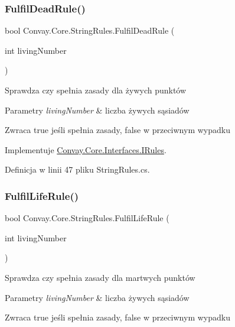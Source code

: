 \subsubsection{\texorpdfstring{Fulfil\+Dead\+Rule()}{FulfilDeadRule()}}
{\footnotesize\ttfamily bool Convay.\+Core.\+String\+Rules.\+Fulfil\+Dead\+Rule (\begin{DoxyParamCaption}\item[{int}]{living\+Number }\end{DoxyParamCaption})}



Sprawdza czy spełnia zasady dla żywych punktów 


\begin{DoxyParams}{Parametry}
{\em living\+Number} & liczba żywych sąsiadów\\
\hline
\end{DoxyParams}
\begin{DoxyReturn}{Zwraca}
true jeśli spełnia zasady, false w przeciwnym wypadku
\end{DoxyReturn}


Implementuje \hyperlink{interface_convay_1_1_core_1_1_interfaces_1_1_i_rules_a180f2cc36d8f7db4407f679c18cf51b6}{Convay.\+Core.\+Interfaces.\+I\+Rules}.



Definicja w linii 47 pliku String\+Rules.\+cs.

\hypertarget{class_convay_1_1_core_1_1_string_rules_abe8f44d51271581b0923aacf768b71ba}{}\label{class_convay_1_1_core_1_1_string_rules_abe8f44d51271581b0923aacf768b71ba} 
\subsubsection{\texorpdfstring{Fulfil\+Life\+Rule()}{FulfilLifeRule()}}
{\footnotesize\ttfamily bool Convay.\+Core.\+String\+Rules.\+Fulfil\+Life\+Rule (\begin{DoxyParamCaption}\item[{int}]{living\+Number }\end{DoxyParamCaption})}



Sprawdza czy spełnia zasady dla martwych punktów 


\begin{DoxyParams}{Parametry}
{\em living\+Number} & liczba żywych sąsiadów\\
\hline
\end{DoxyParams}
\begin{DoxyReturn}{Zwraca}
true jeśli spełnia zasady, false w przeciwnym wypadku
\end{DoxyReturn}


